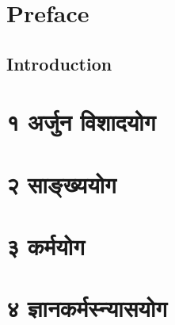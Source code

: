 \documentclass[12pt,twoside,openright,a5paper]{book}
\date{} %
\begin{document}
\sloppy
{}




\thispagestyle{empty}
\frontmatter

\doublespacing
\tableofcontents
\singlespacing

\thispagestyle{empty}
\thispagestyle{empty}
\pagestyle{fancy}


\chapter{Preface}

\begin{onehalfspace}
\chapter{Introduction}

\end{onehalfspace}
\mainmatter
{}
%
\chapter{\devfont १ अर्जुन विशादयोग}

\chapter{\devfont २ साङ्ख्ययोग}

\chapter{\devfont ३ कर्मयोग}

\chapter{\devfont ४ ज्ञानकर्मस्न्यासयोग}

%
\makeatletter\@openrightfalse
\begin{onehalfspace}
  \printindex
\end{onehalfspace}


\end{document}
